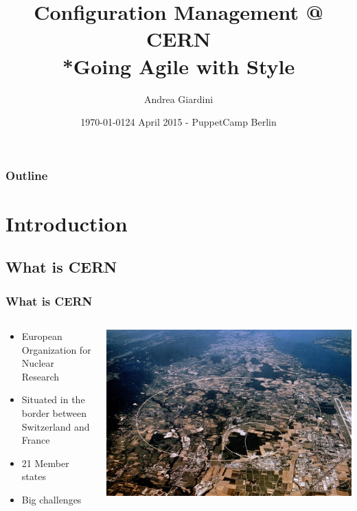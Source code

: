 \documentclass[aspectratio=169]{beamer}
\title[Configuration Management @ CERN]{Configuration Management @ CERN\\
        *Going Agile with Style}
\author{Andrea Giardini}
\date{\today}
\institute[CERN]
{
CERN \\
\medskip
\textit{andrea.giardini@cern.ch}
}
\date{24 April 2015 - PuppetCamp Berlin}
\begin{document}
\cernSplashBlue

\begin{frame}
\titlepage
\end{frame}

\begin{frame}
\frametitle{Outline}
\tableofcontents
\end{frame}


\section{Introduction}

\subsection{What is CERN}

\begin{frame}

    \frametitle{What is CERN}
    \begin{minipage}[t]{0.95\textwidth}
        \begin{columns}
            \begin{column}{0.5\textwidth}
                \begin{itemize}
                    \item European Organization for Nuclear Research
                    \item Situated in the border between Switzerland and France
                    \item 21 Member states
                    \item Big challenges 
                \end{itemize}
            \end{column}
            \begin{column}{0.5\textwidth}
                \includegraphics[width=1.1\textwidth]{CernMap.jpg}
            \end{column}
        \end{columns}
    \end{minipage}

\end{frame}
\end{document}
